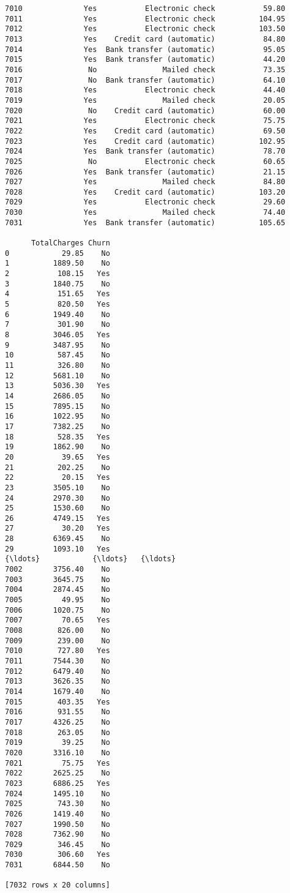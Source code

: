 \documentclass[11pt]{article}
\begin{document}
\begin{tcolorbox}[breakable, boxrule=.5pt, size=fbox, pad at break*=1mm, opacityfill=0]
\begin{Verbatim}[commandchars=\\\{\}]
7010              Yes           Electronic check           59.80
7011              Yes           Electronic check          104.95
7012              Yes           Electronic check          103.50
7013              Yes    Credit card (automatic)           84.80
7014              Yes  Bank transfer (automatic)           95.05
7015              Yes  Bank transfer (automatic)           44.20
7016               No               Mailed check           73.35
7017               No  Bank transfer (automatic)           64.10
7018              Yes           Electronic check           44.40
7019              Yes               Mailed check           20.05
7020               No    Credit card (automatic)           60.00
7021              Yes           Electronic check           75.75
7022              Yes    Credit card (automatic)           69.50
7023              Yes    Credit card (automatic)          102.95
7024              Yes  Bank transfer (automatic)           78.70
7025               No           Electronic check           60.65
7026              Yes  Bank transfer (automatic)           21.15
7027              Yes               Mailed check           84.80
7028              Yes    Credit card (automatic)          103.20
7029              Yes           Electronic check           29.60
7030              Yes               Mailed check           74.40
7031              Yes  Bank transfer (automatic)          105.65

      TotalCharges Churn
0            29.85    No
1          1889.50    No
2           108.15   Yes
3          1840.75    No
4           151.65   Yes
5           820.50   Yes
6          1949.40    No
7           301.90    No
8          3046.05   Yes
9          3487.95    No
10          587.45    No
11          326.80    No
12         5681.10    No
13         5036.30   Yes
14         2686.05    No
15         7895.15    No
16         1022.95    No
17         7382.25    No
18          528.35   Yes
19         1862.90    No
20           39.65   Yes
21          202.25    No
22           20.15   Yes
23         3505.10    No
24         2970.30    No
25         1530.60    No
26         4749.15   Yes
27           30.20   Yes
28         6369.45    No
29         1093.10   Yes
{\ldots}            {\ldots}   {\ldots}
7002       3756.40    No
7003       3645.75    No
7004       2874.45    No
7005         49.95    No
7006       1020.75    No
7007         70.65   Yes
7008        826.00    No
7009        239.00    No
7010        727.80   Yes
7011       7544.30    No
7012       6479.40    No
7013       3626.35    No
7014       1679.40    No
7015        403.35   Yes
7016        931.55    No
7017       4326.25    No
7018        263.05    No
7019         39.25    No
7020       3316.10    No
7021         75.75   Yes
7022       2625.25    No
7023       6886.25   Yes
7024       1495.10    No
7025        743.30    No
7026       1419.40    No
7027       1990.50    No
7028       7362.90    No
7029        346.45    No
7030        306.60   Yes
7031       6844.50    No

[7032 rows x 20 columns]
\end{Verbatim}
\end{tcolorbox}
        
\end{document}
